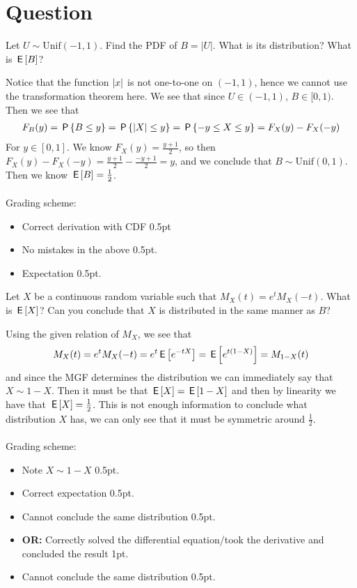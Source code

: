 \section*{Question}
\begin{exercise}[1.5]
Let $U\sim\text{Unif}(-1,1)$. Find the PDF of $B = \left|U\right|$. What is its distribution? What is $\,\mathsf{E}\left[B\right]$?
\begin{solution}
Notice that the function $\left\vert x\right\vert$ is not one-to-one on $(-1,1)$, hence we cannot use the transformation theorem here. We see that since $U\in(-1,1)$, $B\in[0,1)$. Then we see that
\begin{align*}
    F_B(y) = \,\mathsf{P}\left\{B\leq y\right\} = \,\mathsf{P}\left\{\left\vert X\right\vert\leq y\right\} = \,\mathsf{P}\left\{-y\leq X \leq y\right\} = F_X(y) - F_X(-y)
\end{align*}
For $y\in[0,1]$. We know $F_X(y) = \frac{y+1}{2}$, so then $F_X(y) - F_X(-y) = \frac{y+1}{2} - \frac{-y+1}{2} = y$, and we conclude that $B\sim\text{Unif}(0,1)$. Then we  know $\,\mathsf{E}\left[B\right] = \frac12$.
\\\\
Grading scheme:
\begin{itemize}
    \item Correct derivation with CDF 0.5pt
    \item No mistakes in the above 0.5pt.
    \item Expectation 0.5pt.
\end{itemize}
\end{solution}
\end{exercise}

\begin{exercise}[1.5]
Let $X$ be a continuous random variable such that $M_X(t) = e^t M_X(-t)$. What is $\,\mathsf{E}\left[X\right]$? Can you conclude that $X$ is distributed in the same manner as $B$?
\begin{solution}
Using the given relation of $M_X$, we see that
\begin{align*}
    M_X(t) = e^t M_X(-t) = e^t\,\mathsf{E}\left[e^{-t X}\right] = \,\mathsf{E}\left[e^{t(1-X)}\right] = M_{1-X}(t)
\end{align*}
and since the MGF determines the distribution we can immediately say that $X\sim 1-X$. Then it must be that $\,\mathsf{E}\left[X\right] = \,\mathsf{E}\left[1-X\right]$ and then by linearity we have that $\,\mathsf{E}\left[X\right] = \frac12$. This is not enough information to conclude what distribution $X$ has, we can only see that it must be symmetric around $\frac12$.
\\\\
Grading scheme:
\begin{itemize}
    \item Note $X\sim1-X$ 0.5pt.
    \item Correct expectation 0.5pt.
    \item Cannot conclude the same distribution 0.5pt.
    \item \textbf{OR:} Correctly solved the differential equation/took the derivative and concluded the result 1pt.
    \item Cannot conclude the same distribution 0.5pt.
\end{itemize}
\end{solution}
\end{exercise}

